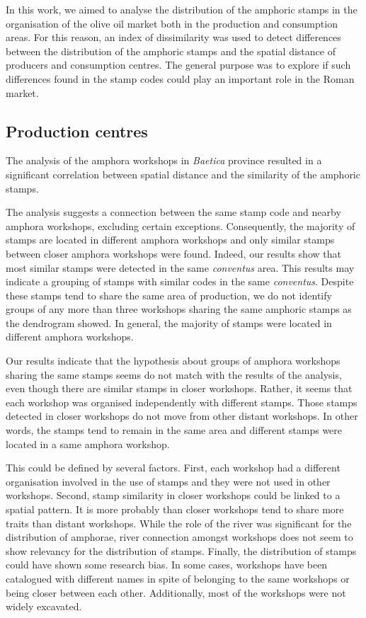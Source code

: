 \documentclass[review]{elsarticle}
\begin{document}
In this work, we aimed to analyse the distribution of the amphoric stamps in the organisation of the olive oil market both in the production and consumption areas. For this reason, an index of dissimilarity was used to detect differences between the distribution of the amphoric stamps and the spatial distance of producers and consumption centres. The general purpose was to explore if such differences found in the stamp codes could play an important role in the Roman market.  

\subsection{Production centres}

The analysis of the amphora workshops in \textit{Baetica} province resulted in a significant correlation between spatial distance and the similarity of the amphoric stamps. 

The analysis suggests a connection between the same stamp code and nearby amphora workshops, excluding certain exceptions. Consequently, the majority of stamps are located in different amphora workshops and only similar stamps between closer amphora workshops were found. Indeed, our results show that most similar stamps were detected in the same \textit{conventus} area. This results may indicate a grouping of stamps with similar codes in the same \textit{conventus}. Despite these stamps tend to share the same area of production, we do not identify groups of any more than three workshops sharing the same amphoric stamps as the dendrogram showed. In general, the majority of stamps were located in different amphora workshops. 

Our results indicate that the hypothesis about groups of amphora workshops sharing the same stamps seems do not match with the results of the analysis, even though there are similar stamps in closer workshops. Rather, it seems that each workshop was organised independently with different stamps. Those stamps detected in closer workshops do not move from other distant workshops. In other words, the stamps tend to remain in the same area and different stamps were located in a same amphora workshop. 

This could be defined by several factors. First, each workshop had a different organisation involved in the use of stamps and they were not used in other workshops. Second, stamp similarity in closer workshops could be linked to a spatial pattern. It is more probably than closer workshops tend to share more traits than distant workshops. While the role of the river was significant for the distribution of amphorae, river connection amongst workshops does not seem to show relevancy for the distribution of stamps. Finally, the distribution of stamps could have shown some research bias. In some cases, workshops have been catalogued with different names in spite of belonging to the same workshops or being closer between each other. Additionally, most of the workshops were not widely excavated. 
\end{document}
